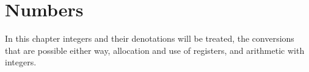 \documentclass[twoside,letterpaper,openright]{rapport3}
\begin{document}
\chapter{Numbers}\label{number}

In this chapter integers and their
denotations will be treated,
the conversions that are possible either way, 
allocation and use of  registers, and
arithmetic with integers.

\label{cschap:number}\label{cschap:romannumeral}\label{cschap:count}\label{cschap:countdef}\label{cschap:newcount}\label{cschap:advance}\label{cschap:multiply}\label{cschap:divide}
\end{document}
